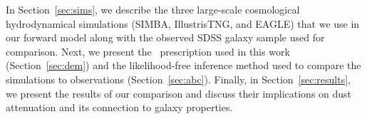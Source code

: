 
In Section~\ref{sec:sims}, we describe the three large-scale cosmological
hydrodynamical simulations (SIMBA, IllustrisTNG, and EAGLE) that we use in
our forward model along with the observed SDSS galaxy sample used for
comparison. 
Next, we present the \eda~prescription used in this work
(Section~\ref{sec:dem}) and the likelihood-free inference method used to 
compare the simulations to observations (Section~\ref{sec:abc}). 
Finally, in Section~\ref{sec:results}, we present the results of our
comparison and discuss their implications on dust attenuation and its
connection to galaxy properties. 



